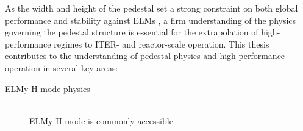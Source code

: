 \documentclass[ twoside,openright,titlepage,numbers=noenddot,headinclude,%
                footinclude=true,cleardoublepage=empty,abstractoff, %
                BCOR=5mm,paper=letter,fontsize=11pt,%
                ngerman,american,%
                ]{scrreprt}
\begin{document}
As the width and height of the pedestal set a strong constraint on both global performance \cite{Kinsey2011} and stability against ELMs \cite{Snyder2003}, a firm understanding of the physics governing the pedestal structure is essential for the extrapolation of high-performance regimes to ITER- and reactor-scale operation.  This thesis contributes to the understanding of pedestal physics and high-performance operation in several key areas:

\begin{description}
 \item[ELMy H-mode physics] \hfill \\
 ELMy H-mode is commonly accessible 
\end{description}


\newpage


\end{document}
